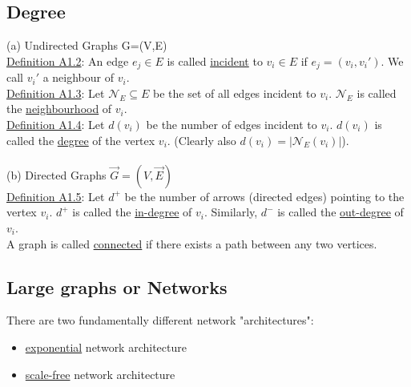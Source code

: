 \documentclass[11pt]{book}
\begin{document}
\vspace{5cm}

\subsection{Degree}
(a) Undirected Graphs G=(V,E)\\

\underline{Definition A1.2}: An edge $e_{j} \in E$ is called \underline{incident} to $v_{i}\in E$ if $e_{j}=(v_{i},v_{i}')$. We call $v_{i}'$ a neighbour of $v_{i}$.\\

\underline{Definition A1.3}: Let $\mathcal{N}_{E} \subseteq E$ be the set of all edges incident to $v_{i}$. $\mathcal{N}_{E}$ is called the \underline{neighbourhood} of $v_{i}$.\\

\underline{Definition A1.4}: Let $d(v_{i})$ be the number of edges incident to $v_{i}$. $d(v_{i})$ is called the \underline{degree} of the vertex $v_{i}$. (Clearly also $d(v_{i}) = |\mathcal{N}_{E}(v_{i})|$).\\
\\(b) Directed Graphs $\stackrel{\rightarrow}{G} = (V,\stackrel{\rightarrow}{E})$\\

\underline{Definition A1.5}: Let $d^{+}$ be the number of arrows (directed edges) pointing to the vertex $v_{i}$. $d^{+}$ is called the \underline{in-degree} of $v_{i}$. Similarly, $d^{-}$ is called the \underline{out-degree} of $v_{i}$.\\

A graph is called \underline{connected} if there exists a path between any two vertices.\\

\subsection{Large graphs or Networks}

There are two fundamentally different network "architectures":
\begin{itemize}
\item \underline{exponential} network architecture
\item \underline{scale-free} network architecture
\end{itemize}
\end{document}
